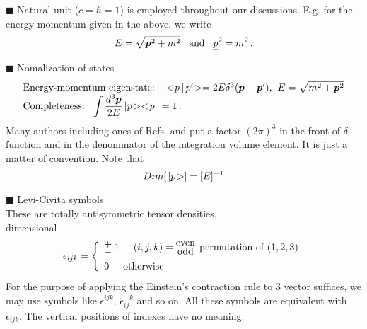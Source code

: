 \bigskip

\bigskip


\noindent
$\blacksquare$ Natural unit ($c = \hbar = 1$) is employed throughout our discussions.
E.g. for the energy-momentum given in the above, we write
\[ E = \sqrt{\mbox{\boldmath $p$}^2 + m^2} 
\hspace{3mm}
\mbox{and}
\hspace{3mm}
\underline{p}^2 = m^2 \,.
\]

\noindent
$\blacksquare$
Nomalization of states\\
\begin{equation*}
\begin{array}{l}
\mbox{Energy-momentum eigenstate:}\hspace{3mm}
 \bra p \braketend p' \ket = 2 E \delta^3 ( \bld{p} - \bld{p}' )$,\hspace{2mm}$E = \sqrt{m^2 + \bld{p}^2}\\
\mbox{Completeness:}\hspace{3mm}
{\displaystyle   \int \frac{d^3 \bld{p}}{2E}} \ketend p \ket \bra p \braend = 1\,.
\end{array}
\label{eqn:statenormalization}
\end{equation*}
Many authors including ones of Refs. \cite{ref:Donnachie} and \cite{ref:Collins} 
put a factor $(2\pi)^3$ in the front of $\delta$ function and in the denominator 
of the integration volume element. It is just a matter of convention.
Note that
\begin{equation*}
Dim[ \,| p \!> ] = [E] ^{-1}
\end{equation*}

\noindent
$\blacksquare$
Levi-Civita symbols\\
These are totally antisymmetric tensor densities.\\

 dimensional
\begin{eqnarray*}
\epsilon_{ijk}
=
\left\{
\begin{array}{l}
\raisebox{-.3\height}{${\stackrel{\displaystyle+}{-}}$} \;1
\hspace{5mm}
(i, j, k) =
\raisebox{-.3\height}{$\stackrel{\mbox{even}}{\mbox{odd}}$} \,\;\mbox{permutation of } (1,2,3)
\vspace{2mm}
\\
0
\hspace{5mm}
\mbox{otherwise}
\end{array}
\right.
\label{eqn:LeviCivita3dim}
\end{eqnarray*}
For the purpose of applying the Einstein's contraction rule to 3 vector suffices,
we may use symbols like $\epsilon^{ijk}$, $\epsilon_{ij}^{\;\;\;k}$ and so on.
All these symbols are equivalent with $\epsilon_{ijk}$.
The vertical positions of indexes have no meaning.\\

